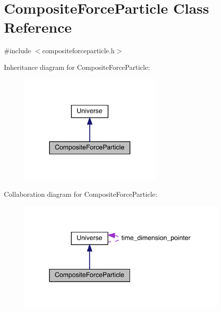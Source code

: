 \hypertarget{class_composite_force_particle}{}\section{Composite\+Force\+Particle Class Reference}
\label{class_composite_force_particle}


{\ttfamily \#include $<$compositeforceparticle.\+h$>$}



Inheritance diagram for Composite\+Force\+Particle\+:\nopagebreak
\begin{figure}[H]
\begin{center}
\leavevmode
\includegraphics[width=203pt]{class_composite_force_particle__inherit__graph}
\end{center}
\end{figure}


Collaboration diagram for Composite\+Force\+Particle\+:
\nopagebreak
\begin{figure}[H]
\begin{center}
\leavevmode
\includegraphics[width=297pt]{class_composite_force_particle__coll__graph}
\end{center}
\end{figure}
